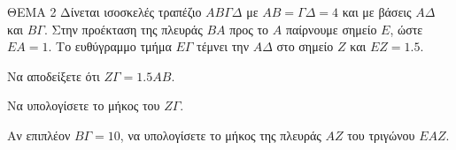 \noindent\textsf{ΘΕΜΑ 2}
\medskip
Δίνεται ισοσκελές τραπέζιο $AB\Gamma\Delta$ με $AB = \Gamma\Delta = 4$ και με βάσεις $A\Delta$ και $B\Gamma$. Στην προέκταση
της πλευράς $BA$ προς το $A$ παίρνουμε σημείο $E$, ώστε $EA = 1$. Το ευθύγραμμο τμήμα $E\Gamma$
τέμνει την $A\Delta$ στο σημείο $Z$ και $EZ = 1.5$.
\begin{alist}
    \item Να αποδείξετε ότι $Z\Gamma = 1.5AB$.  
    \item Να υπολογίσετε το μήκος του $Z\Gamma$.  
    \item Αν επιπλέον $B\Gamma = 10$, να υπολογίσετε το μήκος της πλευράς $AZ$ του τριγώνου $EAZ$.  
\end{alist}